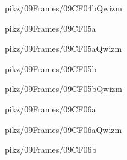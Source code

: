 \documentclass[9pt,xcolor={svgnames, x11names}]{beamer}
\begin{document}

\begin{frame}{pikz/09Frames/09CF04bQwizm}
	
\end{frame}


\begin{frame}{pikz/09Frames/09CF05a}
	
\end{frame}


\begin{frame}{pikz/09Frames/09CF05aQwizm}
	
\end{frame}


\begin{frame}{pikz/09Frames/09CF05b}
	
\end{frame}


\begin{frame}{pikz/09Frames/09CF05bQwizm}
	
\end{frame}


\begin{frame}{pikz/09Frames/09CF06a}
	
\end{frame}


\begin{frame}{pikz/09Frames/09CF06aQwizm}
	
\end{frame}


\begin{frame}{pikz/09Frames/09CF06b}
	
\end{frame}
\end{document}
